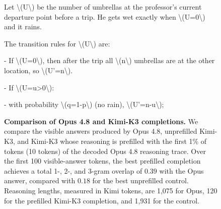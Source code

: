 \begin{figure}[t]
\begin{answercol}[equal height group=ansX0]
  \raggedright Let \textbackslash{}(U\textbackslash{}) be the number of umbrellas at the professor's current departure point before a trip. He gets wet exactly when \textbackslash{}(U=0\textbackslash{}) and it rains.\par\vspace{2pt}
  The transition rules for \textbackslash{}(U\textbackslash{}) are:\par\vspace{2pt}
  - If \textbackslash{}(U=0\textbackslash{}), then after the trip all \textbackslash{}(n\textbackslash{}) umbrellas are at the other location, so \textbackslash{}(U'=n\textbackslash{}).\par\vspace{2pt}
  - If \textbackslash{}(U=u>0\textbackslash{}):\par\vspace{2pt}
  - with probability \textbackslash{}(q=1-p\textbackslash{}) (no rain), \textbackslash{}(U'=n-u\textbackslash{});\par\vspace{3pt}\elide
\end{answercol}
\caption{\textbf{Comparison of Opus 4.8 and Kimi-K3 completions.} We compare
the visible answers produced by Opus 4.8, unprefilled Kimi-K3, and Kimi-K3
whose reasoning is prefilled with the first 1\% of tokens (10 tokens) of the decoded
Opus 4.8 reasoning trace. Over the first 100 visible-answer tokens, the best
prefilled completion achieves a total 1-, 2-, and 3-gram overlap of $0.39$
with the Opus answer, compared with $0.18$ for the best unprefilled
control. Reasoning lengths, measured in Kimi tokens, are 1,075 for Opus,
120 for the prefilled Kimi-K3 completion, and 1,931 for the control.}
\label{fig:exhibit_X0}
\end{figure}


